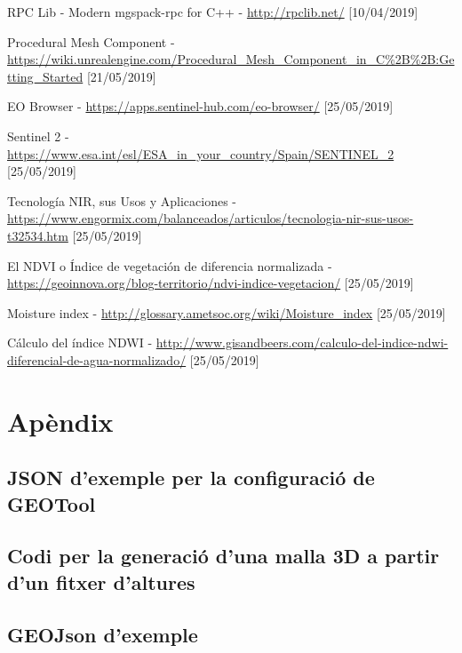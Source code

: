 \documentclass[10pt,a4paper,twocolumn,twoside]{article}
\begin{document}
\begin{thebibliography}{11}
RPC Lib - Modern mgspack-rpc for C++ - \url{http://rpclib.net/} [10/04/2019]

Procedural Mesh Component - \url{https://wiki.unrealengine.com/Procedural_Mesh_Component_in_C%2B%2B:Getting_Started} [21/05/2019]

EO Browser - \url{https://apps.sentinel-hub.com/eo-browser/} [25/05/2019]

Sentinel 2 - \url{https://www.esa.int/esl/ESA_in_your_country/Spain/SENTINEL_2} [25/05/2019]

Tecnología NIR, sus Usos y Aplicaciones - \url{https://www.engormix.com/balanceados/articulos/tecnologia-nir-sus-usos-t32534.htm} [25/05/2019]

El NDVI o Índice de vegetación de diferencia normalizada - \url{https://geoinnova.org/blog-territorio/ndvi-indice-vegetacion/} [25/05/2019]

Moisture index - \url{http://glossary.ametsoc.org/wiki/Moisture_index} [25/05/2019]

Cálculo del índice NDWI - \url{http://www.gisandbeers.com/calculo-del-indice-ndwi-diferencial-de-agua-normalizado/} [25/05/2019]

\end{thebibliography}

\appendix
\section*{Apèndix}

\setcounter{section}{1}

\subsection{JSON d'exemple per la configuració de GEOTool}
\label{appendix:geotoolconfig}


\subsection{Codi per la generació d'una malla 3D a partir d'un fitxer d'altures}
\label{appendix:generateobj}


\subsection{GEOJson d'exemple}
\label{appendix:geojson}

\end{document}
